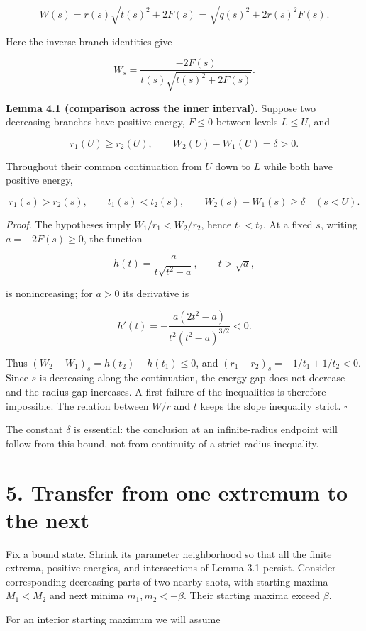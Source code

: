 \documentclass[11pt]{article}
\begin{document}
\[W(s)=r(s)\sqrt{t(s)^2+2F(s)}=\sqrt{q(s)^2+2r(s)^2F(s)}.\]

Here the inverse-branch identities give

\[W_s=\frac{-2F(s)}{t(s)\sqrt{t(s)^2+2F(s)}}. \tag{4.5}\]

\textbf{Lemma 4.1 (comparison across the inner interval).} Suppose two
decreasing branches have positive energy, \(F\leq0\) between levels
\(L\leq U\), and

\[r_1(U)\geq r_2(U),\qquad W_2(U)-W_1(U)=\delta>0.\]

Throughout their common continuation from \(U\) down to \(L\) while both
have positive energy,

\[r_1(s)>r_2(s),\qquad t_1(s)<t_2(s),\qquad W_2(s)-W_1(s)\geq\delta \quad(s<U). \tag{4.6}\]

\emph{Proof.} The hypotheses imply \(W_1/r_1<W_2/r_2\), hence
\(t_1<t_2\). At a fixed \(s\), writing \(a=-2F(s)\geq0\), the function

\[h(t)=\frac{a}{t\sqrt{t^2-a}},\qquad t>\sqrt a,\]

is nonincreasing; for \(a>0\) its derivative is

\[h'(t)=-\frac{a(2t^2-a)}{t^2(t^2-a)^{3/2}}<0.\]

Thus \((W_2-W_1)_s=h(t_2)-h(t_1)\leq0\), and
\((r_1-r_2)_s=-1/t_1+1/t_2<0\). Since \(s\) is decreasing along the
continuation, the energy gap does not decrease and the radius gap
increases. A first failure of the inequalities is therefore impossible.
The relation between \(W/r\) and \(t\) keeps the slope inequality
strict. \(\square\)

The constant \(\delta\) is essential: the conclusion at an
infinite-radius endpoint will follow from this bound, not from
continuity of a strict radius inequality.

\section{5. Transfer from one extremum to the
next}\label{transfer-from-one-extremum-to-the-next}

Fix a bound state. Shrink its parameter neighborhood so that all the
finite extrema, positive energies, and intersections of Lemma 3.1
persist. Consider corresponding decreasing parts of two nearby shots,
with starting maxima \(M_1<M_2\) and next minima \(m_1,m_2<-\beta\).
Their starting maxima exceed \(\beta\).

For an interior starting maximum we will assume
\end{document}
